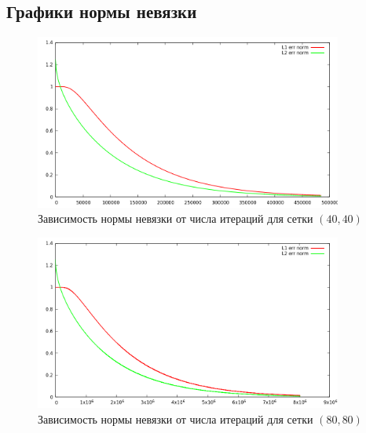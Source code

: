 \documentclass[oneside,final,14pt]{extreport}
\begin{document}
\subsection{Графики нормы невязки}
\begin{figure}[ht!]
  \centering
  \includegraphics[width=0.9\textwidth]{picture6}
  \caption{Зависимость нормы невязки от числа итераций для сетки \((40, 40)\)}
\end{figure}

\begin{figure}[h!]
  \centering
  \includegraphics[width=0.9\textwidth]{picture7}
  \caption{Зависимость нормы невязки от числа итераций для сетки \((80, 80)\)}
\end{figure}

\newpage
\end{document}
